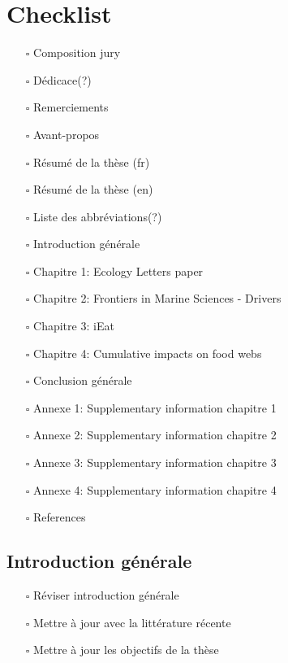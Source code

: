 \hypertarget{checklist}{%
\section{Checklist}\label{checklist}}

\begin{itemize}
\tightlist
\item[$\square$]
  Composition jury
\item[$\square$]
  Dédicace(?)
\item[$\square$]
  Remerciements
\item[$\square$]
  Avant-propos
\item[$\square$]
  Résumé de la thèse (fr)
\item[$\square$]
  Résumé de la thèse (en)
\item[$\square$]
  Liste des abbréviations(?)
\item[$\square$]
  Introduction générale
\item[$\square$]
  Chapitre 1: Ecology Letters paper
\item[$\square$]
  Chapitre 2: Frontiers in Marine Sciences - Drivers
\item[$\square$]
  Chapitre 3: iEat
\item[$\square$]
  Chapitre 4: Cumulative impacts on food webs
\item[$\square$]
  Conclusion générale
\item[$\square$]
  Annexe 1: Supplementary information chapitre 1
\item[$\square$]
  Annexe 2: Supplementary information chapitre 2
\item[$\square$]
  Annexe 3: Supplementary information chapitre 3
\item[$\square$]
  Annexe 4: Supplementary information chapitre 4
\item[$\square$]
  References
\end{itemize}

\hypertarget{introduction-guxe9nuxe9rale}{%
\subsection{Introduction générale}\label{introduction-guxe9nuxe9rale}}

\begin{itemize}
\tightlist
\item[$\square$]
  Réviser introduction générale
\item[$\square$]
  Mettre à jour avec la littérature récente
\item[$\square$]
  Mettre à jour les objectifs de la thèse
\end{itemize}

